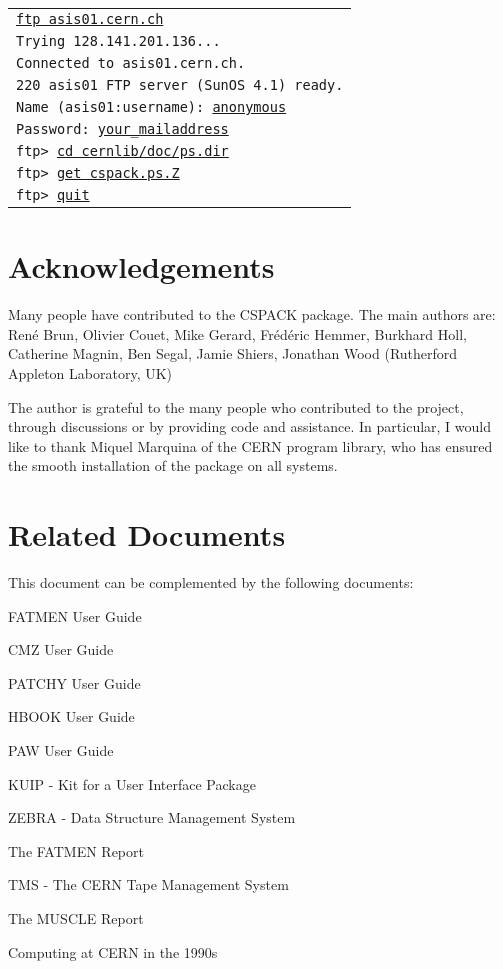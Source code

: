 \vspace*{3mm}
\begin{tabular}{@{\hspace{12mm}}>{\tt}l}
\underline{ftp asis01.cern.ch}\\
Trying 128.141.201.136...\\
Connected to asis01.cern.ch.\\
220 asis01 FTP server (SunOS 4.1) ready.\\
Name (asis01:username): \underline{anonymous}\\
Password: \underline{your\_{}mailaddress}\\
ftp> \underline{cd cernlib/doc/ps.dir}\\
ftp> \underline{get cspack.ps.Z}\\
ftp> \underline{quit}\\
\end{tabular}

\section*{Acknowledgements}

Many people have contributed to the CSPACK package. The main authors
are:
Ren\'e Brun,
Olivier Couet,
Mike Gerard,
Fr\'ed\'eric Hemmer,
Burkhard Holl,
Catherine Magnin,
Ben Segal,
Jamie Shiers,
Jonathan Wood (Rutherford Appleton Laboratory, UK)

The author is grateful to the many people who contributed to the \CSPACK{}
project, through discussions or by providing code and assistance.
In particular, I would like to thank
Miquel Marquina of the CERN
program library, who has ensured the smooth
installation of the package on all systems.

\section*{Related Documents}

This document can be complemented by the following documents:
\begin{UL}
\item FATMEN User Guide~\cite{bib-FATMEN}
\item CMZ User Guide~\cite{bib-CMZ}
\item PATCHY User Guide~\cite{bib-PATCHY}
\item HBOOK User Guide~\cite{bib-HBOOK}
\item PAW User Guide~\cite{bib-PAW}
\item KUIP - Kit for a User Interface Package~\cite{bib-KUIP}
\item ZEBRA - Data Structure Management System~\cite{bib-ZEBRA}
\item The FATMEN Report~\cite{bib-FATREP}
\item TMS - The CERN Tape Management System~\cite{bib-TMS}
\item The MUSCLE Report~\cite{bib-MUSCLE}
\item Computing at CERN in the 1990s~\cite{bib-NGB}
\end{UL}

\tableofcontents
\newpage
\listoftables

